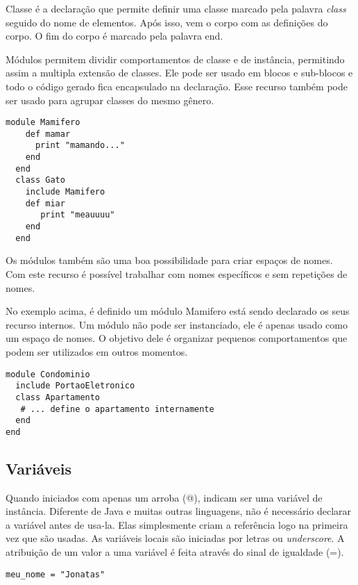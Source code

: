 \documentclass[12pt]{article}
\begin{document}
Classe é a declaração que permite definir uma classe marcado pela palavra \textit{class} seguido do nome de elementos. Após isso, vem o corpo com as definições do corpo. O fim do corpo é marcado pela palavra end.

Módulos permitem dividir comportamentos de classe e de instância, permitindo assim a multipla extensão de classes. Ele pode ser usado em blocos e sub-blocos e todo o código gerado fica encapsulado na declaração. Esse recurso também pode ser usado para agrupar classes do mesmo gênero. 

\begin{lstlisting}[caption=Exemplo de módulo ]
  module Mamifero
    def mamar
      print "mamando..."
    end
  end
  class Gato
    include Mamifero
    def miar
       print "meauuuu"
    end
  end
\end{lstlisting}

Os módulos também são uma boa possibilidade para criar espaços de nomes. Com este recurso é possível trabalhar com nomes específicos e sem repetições de nomes.

No exemplo acima, é definido um módulo Mamifero está sendo declarado os seus recurso internos. Um módulo não pode ser instanciado, ele é apenas usado como um espaço de nomes. O objetivo dele é organizar pequenos comportamentos que podem ser utilizados em outros momentos.

\begin{lstlisting}[caption=Exemplo de módulo como espaço ]
module Condominio
  include PortaoEletronico
  class Apartamento
   # ... define o apartamento internamente
  end
end 
\end{lstlisting}

\subsection{ Variáveis } 

Quando iniciados com apenas um arroba (@), indicam ser uma variável de instância. Diferente de Java e muitas outras linguagens, não é necessário declarar a variável antes de usa-la. Elas simplesmente criam a referência logo na primeira vez que são usadas.
As variáveis locais são iniciadas por letras ou \textit{underscore}.
A atribuição de um valor a uma variável é feita através do sinal de igualdade (=).

\begin{lstlisting}[caption=Exemplo de variável local ]
meu_nome = "Jonatas"
\end{lstlisting}
\end{document}

